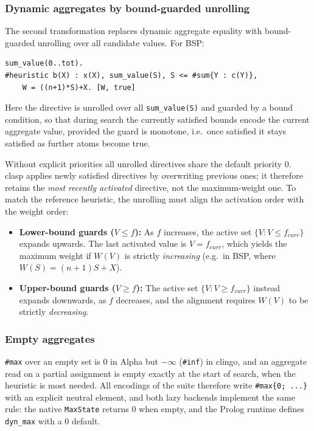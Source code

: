 \subsubsection{Dynamic aggregates by bound-guarded unrolling}

The second transformation replaces dynamic aggregate equality with bound-guarded unrolling over all candidate values. For BSP:

\begin{verbatim}
sum_value(0..tot).
#heuristic b(X) : x(X), sum_value(S), S <= #sum{Y : c(Y)},
    W = ((n+1)*S)+X. [W, true]
\end{verbatim}

Here the directive is unrolled over all \texttt{sum\_value(S)} and guarded by a bound condition, so that during search the currently satisfied bounds encode the current aggregate value, provided the guard is monotone, i.e.\ once satisfied it stays satisfied as further atoms become true.

Without explicit priorities all unrolled directives share the default priority $0$. clasp applies newly satisfied directives by overwriting previous ones; it therefore retains the \emph{most recently activated} directive, not the maximum-weight one. To match the reference heuristic, the unrolling must align the activation order with the weight order:
\begin{itemize}
    \item \textbf{Lower-bound guards ($V \le f$):} As $f$ increases, the active set $\{V : V \le f_{\mathit{curr}}\}$ expands upwards. The last activated value is $V = f_{\mathit{curr}}$, which yields the maximum weight if $W(V)$ is strictly \emph{increasing} (e.g.\ in BSP, where $W(S) = (n{+}1)S + X$).
    \item \textbf{Upper-bound guards ($V \ge f$):} The active set $\{V : V \ge f_{\mathit{curr}}\}$ instead expands downwards, as $f$ decreases, and the alignment requires $W(V)$ to be strictly \emph{decreasing}.
\end{itemize}

\subsubsection{Empty aggregates}

\texttt{\#max} over an empty set is $0$ in Alpha but $-\infty$ (\texttt{\#inf}) in clingo, and an aggregate read on a partial assignment is empty exactly at the start of search, when the heuristic is most needed. All encodings of the suite therefore write \texttt{\#max\{0; ...\}} with an explicit neutral element, and both lazy backends implement the same rule: the native \texttt{MaxState} returns $0$ when empty, and the Prolog runtime defines \texttt{dyn\_max} with a $0$ default.


